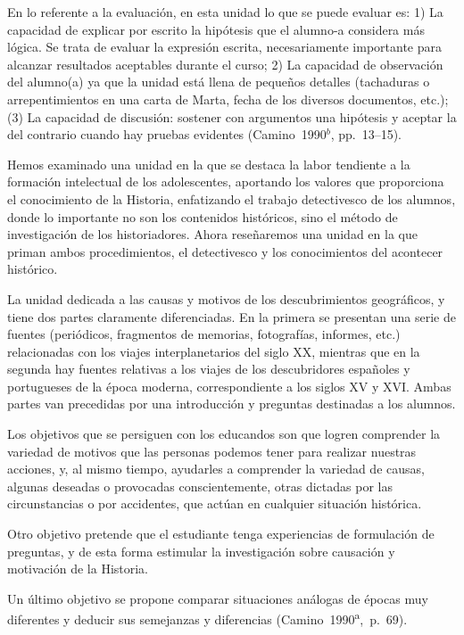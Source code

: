  
En lo referente a la evaluación, en esta unidad lo que se puede evaluar 
es: 1) La capacidad de explicar por escrito la hipótesis que el 
alumno-a considera más lógica. Se trata de evaluar la expresión 
escrita, necesariamente importante para alcanzar resultados aceptables 
durante el curso; 2) La capacidad de observación del alumno(a) ya que la 
unidad está llena de pequeños detalles (tachaduras o arrepentimientos 
en una carta de Marta, fecha de los diversos documentos, etc.);\linebreak (3) La 
capacidad de discusión: sostener con argumentos una hipótesis y 
aceptar la del contrario cuando hay pruebas 
evidentes (Camino~1990$^{b}$, pp.~\mbox{13--15}).

 
Hemos examinado una unidad en la que se destaca la labor tendiente a la 
formación intelectual de los adolescentes, aportando los valores que 
proporciona el conocimiento de la Historia, enfatizando el trabajo 
detectivesco de los alumnos, donde lo importante no son los contenidos 
históricos, sino el método de investigación de los historiadores. Ahora 
reseñaremos una unidad en la que priman ambos procedimientos, el 
detectivesco y los conocimientos del acontecer histórico.
\enlargethispage{1\baselineskip}

La unidad dedicada a las causas y motivos de los descubrimientos 
geográficos, y tiene dos partes claramente diferenciadas. En la primera 
se presentan una serie de fuentes (periódicos, fragmentos de 
memorias, fotografías, informes, etc.) relacionadas con los viajes 
interplanetarios del siglo XX, mientras que en la segunda hay fuentes 
relativas a los viajes de los descubridores españoles y portugueses de 
la época moderna, correspondiente a los siglos XV y XVI\@. Ambas partes 
van precedidas por una introducción y preguntas destinadas a los 
alumnos.

 
Los objetivos que se persiguen con los educandos son que logren 
comprender la variedad de motivos que las personas podemos tener 
para realizar nuestras acciones, y, al mismo tiempo, ayudarles a 
comprender la variedad de causas, algunas deseadas o provocadas 
conscientemente, otras dictadas por las circunstancias o por 
accidentes, que actúan en cualquier situación histórica.

 
Otro objetivo pretende que el estudiante tenga experiencias de 
formulación de preguntas, y de esta forma estimular la investigación 
sobre causación y motivación de la Historia.

\begin{sloppypar} 
Un último objetivo se propone comparar situaciones análogas de épocas 
muy diferentes y deducir sus semejanzas  y  diferencias \mbox{(Camino~1990\textsuperscript{a}, p.~69)}.
\end{sloppypar}

